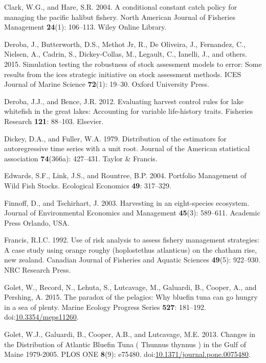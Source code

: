 \documentclass[]{article}
\begin{document}
\hypertarget{ref-clark2004conditional}{}
Clark, W.G., and Hare, S.R. 2004. A conditional constant catch policy
for managing the pacific halibut fishery. North American Journal of
Fisheries Management \textbf{24}(1): 106--113. Wiley Online Library.

\hypertarget{ref-deroba2015simulation}{}
Deroba, J., Butterworth, D.S., Methot Jr, R., De Oliveira, J.,
Fernandez, C., Nielsen, A., Cadrin, S., Dickey-Collas, M., Legault, C.,
Ianelli, J., and others. 2015. Simulation testing the robustness of
stock assessment models to error: Some results from the ices strategic
initiative on stock assessment methods. ICES Journal of Marine Science
\textbf{72}(1): 19--30. Oxford University Press.

\hypertarget{ref-Deroba2012Evaluating}{}
Deroba, J.J., and Bence, J.R. 2012. Evaluating harvest control rules for
lake whitefish in the great lakes: Accounting for variable life-history
traits. Fisheries Research \textbf{121}: 88--103. Elsevier.

\hypertarget{ref-Dickey1979DistributionRoot}{}
Dickey, D.A., and Fuller, W.A. 1979. Distribution of the estimators for
autoregressive time series with a unit root. Journal of the American
statistical association \textbf{74}(366a): 427--431. Taylor \& Francis.

\hypertarget{ref-Edwards2004PortfolioStocks}{}
Edwards, S.F., Link, J.S., and Rountree, B.P. 2004. Portfolio Management
of Wild Fish Stocks. Ecological Economics \textbf{49}: 317--329.

\hypertarget{ref-Finnoff2003HarvestingEcosystem}{}
Finnoff, D., and Tschirhart, J. 2003. Harvesting in an eight-species
ecosystem. Journal of Environmental Economics and Management
\textbf{45}(3): 589--611. Academic Press Orlando, USA.

\hypertarget{ref-francis1992use}{}
Francis, R.I.C. 1992. Use of risk analysis to assess fishery management
strategies: A case study using orange roughy (hoplostethus atlanticus)
on the chatham rise, new zealand. Canadian Journal of Fisheries and
Aquatic Sciences \textbf{49}(5): 922--930. NRC Research Press.

\hypertarget{ref-golet_paradox_2015}{}
Golet, W., Record, N., Lehuta, S., Lutcavage, M., Galuardi, B., Cooper,
A., and Pershing, A. 2015. The paradox of the pelagics: Why bluefin tuna
can go hungry in a sea of plenty. Marine Ecology Progress Series
\textbf{527}: 181--192.
doi:\href{https://doi.org/10.3354/meps11260}{10.3354/meps11260}.

\hypertarget{ref-golet_changes_2013}{}
Golet, W.J., Galuardi, B., Cooper, A.B., and Lutcavage, M.E. 2013.
Changes in the Distribution of Atlantic Bluefin Tuna ( Thunnus thynnus )
in the Gulf of Maine 1979-2005. PLOS ONE \textbf{8}(9): e75480.
doi:\href{https://doi.org/10.1371/journal.pone.0075480}{10.1371/journal.pone.0075480}.
\end{document}
